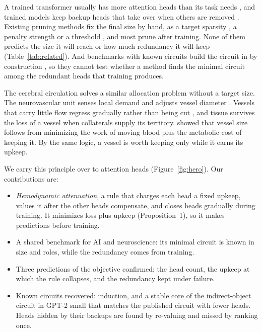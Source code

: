 \documentclass[letterpaper]{article} %
\begin{document}
A trained transformer usually has more attention heads than its task needs \citep{michel2019sixteen,voita2019analyzing}, and trained models keep backup heads that take over when others are removed \citep{wang2023interpretability,mcgrath2023hydra}. Existing pruning methods fix the final size by hand, as a target sparsity \citep{zhu2017prune}, a penalty strength \citep{voita2019analyzing,nam2025chg} or a threshold \citep{conmy2023towards}, and most prune after training. None of them predicts the size it will reach or how much redundancy it will keep (Table~\ref{tab:related}). And benchmarks with known circuits build the circuit in by construction \citep{lindner2023tracr,gupta2024interpbench}, so they cannot test whether a method finds the minimal circuit among the redundant heads that training produces.

The cerebral circulation solves a similar allocation problem without a target size. The neurovascular unit senses local demand and adjusts vessel diameter \citep{iadecola2017nvu}. Vessels that carry little flow regress gradually rather than being cut \citep{korn2015pruning}, and tissue survives the loss of a vessel when collaterals supply its territory. \citet{murray1926} showed that vessel size follows from minimizing the work of moving blood plus the metabolic cost of keeping it. By the same logic, a vessel is worth keeping only while it earns its upkeep.

We carry this principle over to attention heads (Figure~\ref{fig:hero}). Our contributions are:
\begin{itemize}
\item \emph{Hemodynamic attenuation}, a rule that charges each head a fixed upkeep, values it after the other heads compensate, and closes heads gradually during training. It minimizes loss plus upkeep (Proposition~1), so it makes predictions before training.
\item A shared benchmark for AI and neuroscience: its minimal circuit is known in size and roles, while the redundancy comes from training.
\item Three predictions of the objective confirmed: the head count, the upkeep at which the rule collapses, and the redundancy kept under failure.
\item Known circuits recovered: induction, and a stable core of the indirect-object circuit in GPT-2 small that matches the published circuit with fewer heads. Heads hidden by their backups are found by re-valuing and missed by ranking once.
\end{itemize}
\end{document}
